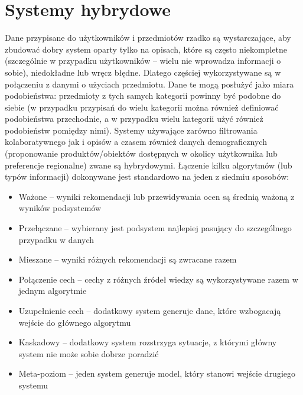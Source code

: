 \documentclass{pracamgr}
\begin{document}
  \section{Systemy hybrydowe}
   Dane przypisane do użytkowników i przedmiotów rzadko są wystarczające, aby zbudować dobry system oparty tylko na opisach,
   które są często niekompletne (szczególnie w przypadku użytkowników -- wielu nie wprowadza informacji o sobie), niedokładne lub wręcz błędne.
   Dlatego częściej wykorzystywane są w połączeniu z danymi o użyciach przedmiotu. Dane te mogą posłużyć jako miara podobieństwa:
   przedmioty z tych samych kategorii powinny być podobne do siebie
   (w przypadku przypisań do wielu kategorii można również definiować podobieństwa przechodnie,
   a w przypadku wielu kategorii użyć również podobieństw pomiędzy nimi).
   Systemy używające zarówno filtrowania kolaboratywnego jak i opisów a czasem również danych demograficznych
   (proponowanie produktów/obiektów dostępnych w okolicy użytkownika lub preferencje regionalne) zwane są hybrydowymi.
   Łączenie kilku algorytmów (lub typów informacji) dokonywane jest standardowo na jeden z siedmiu sposobów:
   \begin{itemize}\itemsep1pt \parskip0pt 
    \item Ważone -- wyniki rekomendacji lub przewidywania ocen są średnią ważoną z wyników podsystemów
    \item Przełączane -- wybierany jest podsystem najlepiej pasujący do szczególnego przypadku w danych
    \item Mieszane -- wyniki różnych rekomendacji są zwracane razem
    \item Połączenie cech -- cechy z różnych źródeł wiedzy są wykorzystywane razem w jednym algorytmie
    \item Uzupełnienie cech -- dodatkowy system generuje dane, które wzbogacają wejście do głównego algorytmu
    \item Kaskadowy -- dodatkowy system rozstrzyga sytuacje, z którymi główny system nie może sobie dobrze poradzić
    \item Meta-poziom -- jeden system generuje model, który stanowi wejście drugiego systemu
   \end{itemize}\newpage
\end{document}
